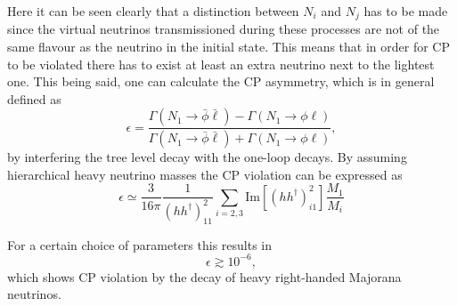 \noindent
Here it can be seen clearly that a distinction between $N_i$ and $N_j$ has to be made since the virtual neutrinos transmissioned during these processes are not of the same flavour as the neutrino in the initial state. This means that in order for CP to be violated there has to exist at least an extra neutrino next to the lightest one. \newline\indent
This being said, one can calculate the CP asymmetry\cite[pp. 24ff.]{Davidson:2008bu}, which is in general defined as
\begin{equation}
	\epsilon=\frac{\Gamma(N_1\rightarrow\bar{\phi}\bar{\ell})-\Gamma(N_1\rightarrow\phi\ell)}{\Gamma(N_1\rightarrow\bar{\phi}\bar{\ell})+\Gamma(N_1\rightarrow\phi\ell)},
	\label{eq:CP_violation}
\end{equation}
by interfering the tree level decay with the one-loop decays. By assuming hierarchical heavy neutrino masses the CP violation can be expressed as \cite[Eq. (55)]{Buchmuller:2005eh} 
\begin{equation}
	\epsilon\simeq\frac{3}{16\pi}\frac{1}{\left(hh^\dagger\right)^2_{11}}\sum_{i=2,3}\text{Im}\left[\left(hh^\dagger\right)^2_{i1}\right]\frac{M_1}{M_i}
\end{equation}

For a certain choice of parameters this results in \cite[p. 26]{Davidson:2008bu}
\begin{equation}
	\epsilon\gtrsim10^{-6},
	\label{eq:CP_value}
\end{equation}
which shows CP violation by the decay of heavy right-handed Majorana neutrinos. 
